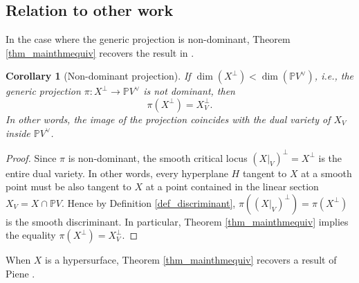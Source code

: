 \documentclass[12pt]{amsart}
\newtheorem{corollary}[theorem]{Corollary}
\begin{document}

\subsection{Relation to other work}
 In the case where the generic projection is non-dominant, Theorem \ref{thm_mainthmequiv} recovers the result in \cite[Theorem 1.21]{Tev05}.
\begin{corollary}[Non-dominant projection] \cite[Theorem 1.21]{Tev05}
     If $\dim(X^{\perp})<\dim(\mathbb PV^{\vee})$, i.e., the generic projection $\pi:X^{\perp}\to \mathbb PV^{\vee}$ is not dominant, then 
$$\pi(X^{\perp})=X_V^{\perp}.$$
     In other words, the image of the projection coincides with the dual variety of $X_V$ inside $\mathbb PV^{\vee}$.
\end{corollary}
\begin{proof}
    Since $\pi$ is non-dominant, the smooth critical locus $(X|_V)^{\perp}=X^{\perp}$ is the entire dual variety. In other words, every hyperplane $H$ tangent to $X$ at a smooth point must be also tangent to $X$ at a point contained in the linear section $X_V=X\cap \mathbb PV$. Hence by Definition \ref{def_discriminant}, $\pi((X|_V)^{\perp})=\pi(X^{\perp})$ is the smooth discriminant. In particular, Theorem \ref{thm_mainthmequiv} implies the equality $\pi(X^{\perp})=X_V^{\perp}$.
\end{proof}
When $X$ is a hypersurface, Theorem \ref{thm_mainthmequiv} recovers a result of Piene
\cite[Corollary 4.3]{Pie78}.
\end{document}
